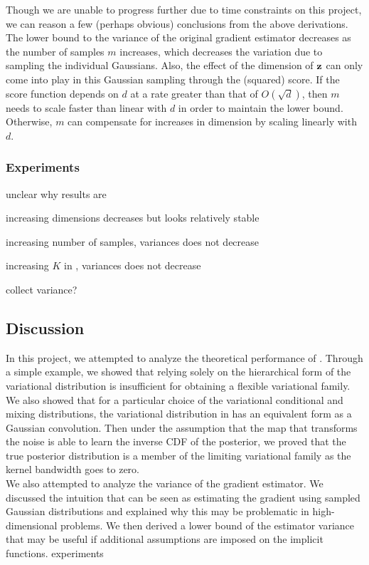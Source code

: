 \documentclass[10pt]{article}
\begin{document}
Though we are unable to progress further due to time constraints on this project, we can reason a few (perhaps obvious) conclusions from the above derivations. The lower bound to the variance of the original gradient estimator decreases as the number of samples $m$ increases, which decreases the variation due to sampling the individual Gaussians. Also, the effect of the dimension of $\mathbf{z}$ can only come into play in this Gaussian sampling through the (squared) score. If the score function depends on $d$ at a rate greater than that of $O(\sqrt{d})$, then $m$ needs to scale faster than linear with $d$ in order to maintain the lower bound. Otherwise, $m$ can compensate for increases in dimension by scaling linearly with $d$.


\subsubsection{Experiments}

\todo unclear why results are

increasing dimensions \elbo decreases but looks relatively stable

increasing number of \mcmc samples, variances does not decrease

increasing $K$ in \sivi, variances does not decrease

\todo collect variance?


\subsection{Discussion} \label{sec:discussion}

In this project, we attempted to analyze the theoretical performance of \uivi. Through a simple example, we showed that relying solely on the hierarchical form of the variational distribution is insufficient for obtaining a flexible variational family. We also showed that for a particular choice of the variational conditional and mixing distributions, the variational distribution in \uivi has an equivalent form as a Gaussian convolution. Then under the assumption that the map that transforms the noise is able to learn the inverse CDF of the posterior, we proved that the true posterior distribution is a member of the limiting variational family as the kernel bandwidth goes to zero.
\\

We also attempted to analyze the variance of the \elbo gradient estimator. We discussed the intuition that \uivi can be seen as estimating the \elbo gradient using sampled Gaussian distributions and explained why this may be problematic in high-dimensional problems. We then derived a lower bound of the estimator variance that may be useful if additional assumptions are imposed on the implicit functions. \todo experiments
\\
\end{document}
